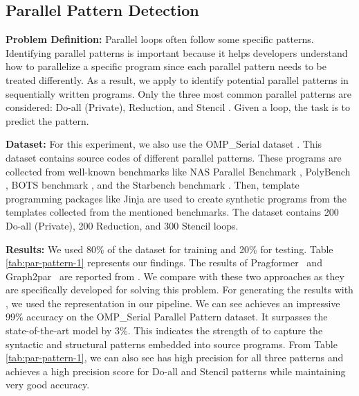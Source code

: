 \subsection{Parallel Pattern Detection}
\vspace{-5pt}
\textbf{Problem Definition:}
Parallel loops often follow some specific patterns. Identifying parallel patterns is important because it helps developers understand how to parallelize a specific program since each parallel pattern needs to be treated differently. As a result, we apply \ourtool to identify potential parallel patterns in sequentially written programs.
Only the three most common parallel patterns are considered: Do-all (Private), Reduction, and Stencil \cite{reinders2021common}. Given a loop, the task is to predict the pattern.

\textbf{Dataset:}
For this experiment, we also use the OMP\_Serial dataset \cite{chen2023learning}. This dataset contains source codes of different parallel patterns. These programs are collected from well-known benchmarks like NAS Parallel Benchmark \cite{jin1999openmp}, PolyBench \cite{pouchet2017polybench},
BOTS benchmark \cite{duran2009barcelona}, and the Starbench benchmark \cite{andersch2013benchmark}. Then, template programming packages like Jinja \cite{ronacher2008jinja2} are used to create synthetic programs from the templates collected from the mentioned benchmarks. The dataset contains 200 Do-all (Private), 200 Reduction, and 300 Stencil loops. 

\textbf{Results:}
We used 80\% of the dataset for training and 20\% for testing. Table \ref{tab:par-pattern-1} represents our findings. The results of Pragformer~\cite{kadosh2023pragformer} and Graph2par~\cite{chen2023learning} are reported from \cite{chen2023learning}. We compare with these two approaches as they are specifically developed for solving this problem. For generating the results with \programl, we used the \programl representation in our pipeline. We can see \ourtool achieves an impressive 99\% accuracy on the OMP\_Serial Parallel Pattern dataset. It surpasses the state-of-the-art \programl model by 3\%. This indicates the strength of \ourtool to capture the syntactic and structural patterns embedded into source programs. From Table \ref{tab:par-pattern-1}, we can also see \ourtool has high precision for all three patterns and achieves a high precision score for Do-all and Stencil patterns while maintaining very good accuracy.

